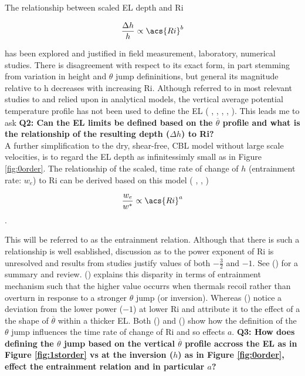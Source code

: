 The relationship between scaled \acs{EL} depth and \acs{Ri} 

\begin{equation}
\frac{\Delta h}{h} \propto  \acs{Ri}^{b}
\end{equation}

has been explored and justified in field measurement, laboratory, numerical studies.  There is disagreement with respect to its exact form, in part stemming from variation in height and $\theta$ jump defininitions, but general its magnitude relative to h decreases with increasing \acs{Ri}. Although referred to in most relevant studies to and relied upon in analytical models, the vertical average potential temperature profile has not been used to define the \acs{EL} (\citeauthor{DearWill80} \citeyear{DearWill80}, \citeauthor{StullNelEl} \citeyear{StullNelEl}, \citeauthor{FedConzMir04} \citeyear{FedConzMir04}, \citeauthor{Boers89} \citeyear{Boers89}, \citeauthor{BrooksFowler2} \citeyear{BrooksFowler2}). This leads me to ask \textbf{Q2: Can the \acs{EL} limits be defined based on the $\overline{\theta}$ profile and what is the relationship of the resulting depth ($\Delta h$) to \acs{Ri}?}\\


A further simplification to the dry, shear-free, \acs{CBL} model without large scale velocities, is to regard the \acs{EL} depth as infinitessimly small as in Figure \ref{fig:0order}.  The relationship of the scaled, time rate of change of $h$ (entrainment rate: $w_{e}$) to \acs{Ri} can be derived based on this model (\citeauthor{Tennekes73} \citeyear{Tennekes73}, \citeauthor{Deardorff79} \citeyear{Deardorff79}, \citeauthor{FedConzMir04} \citeyear{FedConzMir04})

\begin{equation}
\frac{w_{e}}{w^{*}} \propto  \acs{Ri}^{a}
\end{equation}.
 
This will be referred to as the entrainment relation.  Although that there is such a relationship is well esablished, discussion as to the power exponent of \acs{Ri} is unresolved and results from studies justify values of both $-\frac{3}{2}$ and $-1$. See \citeauthor{Traum11} (\citeyear{Traum11}) for a summary and review.  \citeauthor{Turner86} (\citeyear{Turner86}) explains this disparity in terms of entrainment mechanism such that the higher value occurrs when thermals recoil rather than overturn in response to a stronger $\theta$ jump (or inversion).  Whereas \citeauthor{SullMoengStev} (\citeyear{SullMoengStev}) notice a deviation from the lower power ($-1$) at lower \acs{Ri} and attribute it to the effect of a the shape of $\overline{\theta}$ within a thicker \acs{EL}.  Both \citeauthor{FedConzMir04} (\citeyear{FedConzMir04}) and \citeauthor{GarciaMellado} (\citeyear{GarciaMellado}) show how the definition of the $\theta$ jump influences the time rate  of change of \acs{Ri} and so effects $a$. \textbf{Q3: How does defining the $\theta$ jump based on the vertical $\overline{\theta}$ profile accross the \acs{EL} as in Figure \ref{fig:1storder} vs at the inversion ($h$) as in Figure \ref{fig:0order}, effect the entrainment relation and in particular $a$?}\\


